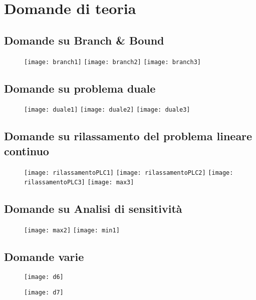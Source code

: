 \documentclass[\main/main.tex]{subfiles}
\begin{document}
\section{Domande di teoria}

\subsection{Domande su Branch \& Bound}
\begin{figure}
  \texttt{[image: branch1]}
  \texttt{[image: branch2]}
  \texttt{[image: branch3]}
\end{figure}
\subsection{Domande su problema duale}
\begin{figure}
  \texttt{[image: duale1]}
  \texttt{[image: duale2]}
  \texttt{[image: duale3]}
\end{figure}
\subsection{Domande su rilassamento del problema lineare continuo}
\begin{figure}
  \texttt{[image: rilassamentoPLC1]}
  \texttt{[image: rilassamentoPLC2]}
  \texttt{[image: rilassamentoPLC3]}
  \texttt{[image: max3]}
\end{figure}
\subsection{Domande su Analisi di sensitività}
\begin{figure}
  \texttt{[image: max2]}
  \texttt{[image: min1]}
\end{figure}
\subsection{Domande varie}
\begin{figure}
  \texttt{[image: d6]}
\end{figure}
\begin{figure}
  \texttt{[image: d7]}
\end{figure}
\end{document}
